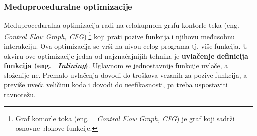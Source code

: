 \documentclass[a4paper]{article}
\begin{document}
\subsubsection{Međuproceduralne optimizacije}
\label{subsubsec:međuproceduralne} 
Međuproceduralna optimizacija radi na celokupnom grafu kontorle toka (eng. ~ {\em Control Flow Graph, CFG}) \footnote{Graf kontorle toka (eng. ~ {\em Control Flow Graph, CFG}) je graf koji sadrži osnovne blokove funkcije.} koji prati pozive funkcija i njihovu međusobnu interakciju. \cite{kkMVJ}
Ova optimizacija se vrši na nivou celog programa tj. više funkcija. U okviru ove optimizacije jedna od najznačajnijih tehnika je \textbf{uvlačenje definicija funkcija (eng. ~{\em Inlining})}. 
Uglavnom se jednostavnije funkcije uvlače, a složenije ne. 
Premalo uvlačenja dovodi do troškova vezanih za pozive funkcija, a previše uveća veličinu koda i dovodi do neefikasnosti, pa treba uspostaviti ravnotežu. \cite{kkFM}
\end{document}
